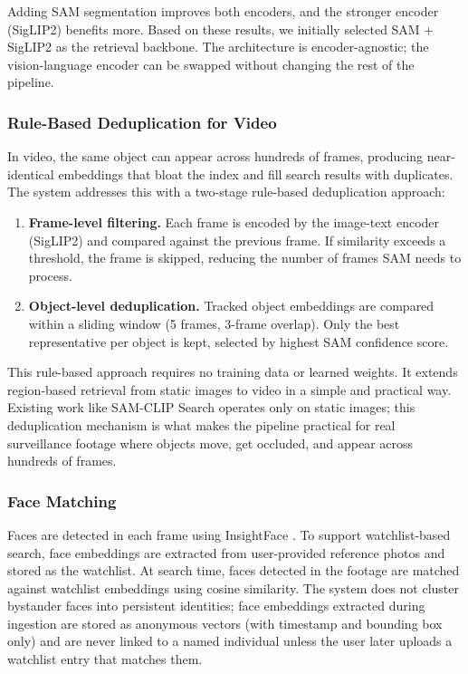 Adding SAM segmentation improves both encoders, and the stronger encoder (SigLIP2) benefits more. Based on these results, we initially selected SAM + SigLIP2 as the retrieval backbone. The architecture is encoder-agnostic; the vision-language encoder can be swapped without changing the rest of the pipeline.

\subsubsection{Rule-Based Deduplication for Video}
\label{subsubsec:dedup}

In video, the same object can appear across hundreds of frames, producing near-identical embeddings that bloat the index and fill search results with duplicates. The system addresses this with a two-stage rule-based deduplication approach:

\begin{enumerate}
    \item \textbf{Frame-level filtering.} Each frame is encoded by the image-text encoder (SigLIP2) and compared against the previous frame. If similarity exceeds a threshold, the frame is skipped, reducing the number of frames SAM needs to process.

    \item \textbf{Object-level deduplication.} Tracked object embeddings are compared within a sliding window (5 frames, 3-frame overlap). Only the best representative per object is kept, selected by highest SAM confidence score.
\end{enumerate}

This rule-based approach requires no training data or learned weights. It extends region-based retrieval from static images to video in a simple and practical way. Existing work like SAM-CLIP Search \cite{mulani2025samclip} operates only on static images; this deduplication mechanism is what makes the pipeline practical for real surveillance footage where objects move, get occluded, and appear across hundreds of frames.

\subsubsection{Face Matching}

Faces are detected in each frame using InsightFace \cite{deng2019arcface}. To support watchlist-based search, face embeddings are extracted from user-provided reference photos and stored as the watchlist. At search time, faces detected in the footage are matched against watchlist embeddings using cosine similarity. The system does not cluster bystander faces into persistent identities; face embeddings extracted during ingestion are stored as anonymous vectors (with timestamp and bounding box only) and are never linked to a named individual unless the user later uploads a watchlist entry that matches them.

